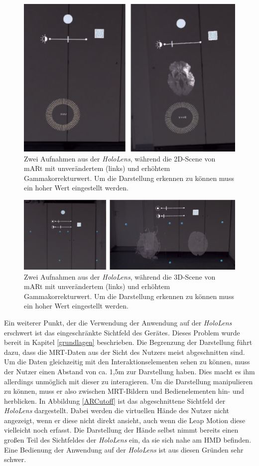 \begin{figure}[!htb]
	\centering
	\includegraphics[width=0.7\linewidth]{images/mARt_AR_brightness.png}
	\caption{Zwei Aufnahmen aus der \textit{HoloLens}, während die 2D-Scene von mARt mit unverändertem (links) und erhöhtem Gammakorrekturwert. Um die Darstellung erkennen zu können muss ein hoher Wert eingestellt werden.}
	\label{img:ARLicht}
\end{figure}
\FloatBarrier

\begin{figure}[!htb]
	\centering
	\includegraphics[width=0.9\linewidth]{images/mARt_AR_brightness_3D.png}
	\caption{Zwei Aufnahmen aus der \textit{HoloLens}, während die 3D-Scene von mARt mit unverändertem (links) und erhöhtem Gammakorrekturwert. Um die Darstellung erkennen zu können muss ein hoher Wert eingestellt werden.}
	\label{img:ARLicht3D}
\end{figure}
\FloatBarrier

Ein weiterer Punkt, der die Verwendung der Anwendung auf der \textit{HoloLens} erschwert ist das eingeschränkte Sichtfeld des Gerätes. Dieses Problem wurde bereit in Kapitel \ref{grundlagen} beschrieben. 
Die Begrenzung der Darstellung führt dazu, dass die MRT-Daten aus der Sicht des Nutzers meist abgeschnitten sind. Um die Daten gleichzeitig mit den Interaktionselementen sehen zu können, muss der Nutzer einen Abstand von ca. 1,5m zur Darstellung haben. Dies macht es ihm allerdings unmöglich mit dieser zu interagieren. Um die Darstellung manipulieren zu können, muss er also zwischen MRT-Bildern und Bedienelementen hin- und herblicken. In Abbildung \ref{ARCutoff} ist das abgeschnittene Sichtfeld der \textit{HoloLens} dargestellt. Dabei werden die virtuellen Hände des Nutzer nicht angezeigt, wenn er diese nicht direkt ansieht, auch wenn die Leap Motion diese vielleicht noch erfasst. 
Die Darstellung der Hände selbst nimmt bereits einen großen Teil des Sichtfeldes der \textit{HoloLens} ein, da sie sich nahe am HMD befinden. 
Eine Bedienung der Anwendung auf der \textit{HoloLens} ist aus diesen Gründen sehr schwer. 

